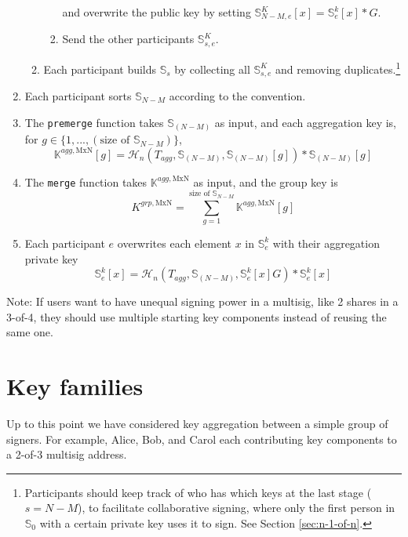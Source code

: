 \begin{enumerate}
\begin{enumerate}
\begin{enumerate}
            and overwrite the public key by setting $\mathbb{S}^K_{N-M,e}[x] = \mathbb{S}^{k}_{e}[x]*G$.
            \item Send the other participants $\mathbb{S}^K_{s,e}$.
        \end{enumerate}
        \item Each participant builds $\mathbb{S}_{s}$ by collecting all $\mathbb{S}^K_{s,e}$ and removing duplicates.\footnote{Participants should keep track of who has which keys at the last stage ($s = N-M$), to facilitate collaborative signing, where only the first person in $\mathbb{S}_0$ with a certain private key uses it to sign. See Section \ref{sec:n-1-of-n}.}
    \end{enumerate}
    \item Each participant sorts $\mathbb{S}_{N-M}$ according to the convention.
    \item The {\tt premerge} function takes $\mathbb{S}_{(N-M)}$ as input, and each aggregation key is, for \(g \in \{1,...,(\textrm{size of }\mathbb{S}_{N-M})\}\),\vspace{.175cm}
    \[\mathbb{K}^{agg,\textrm{MxN}}[g] = \mathcal{H}_n(T_{agg},\mathbb{S}_{(N-M)},\mathbb{S}_{(N-M)}[g])*\mathbb{S}_{(N-M)}[g]\]
    \item The {\tt merge} function takes $\mathbb{K}^{agg,\textrm{MxN}}$ as input, and the group key is\vspace{.175cm}
    \[K^{grp,\textrm{MxN}} = \sum^{\textrm{size of }\mathbb{S}_{N-M}}_{g = 1} \mathbb{K}^{agg,\textrm{MxN}}[g]\]
    \item Each participant $e$ overwrites each element $x$ in $\mathbb{S}^k_{e}$ with their aggregation private key\vspace{.175cm}
    \[ \mathbb{S}^k_{e}[x] = \mathcal{H}_n(T_{agg},\mathbb{S}_{(N-M)},\mathbb{S}^k_{e}[x] G)*\mathbb{S}^k_{e}[x] \]
\end{enumerate}

Note: If users want to have unequal signing power in a multisig, like 2 shares in a 3-of-4, they should use multiple starting key components instead of reusing the same one.



\section{Key families}
\label{sec:general-key-families}

Up to this point we have considered key aggregation between a simple group of signers. For example, Alice, Bob, and Carol each contributing key components to a 2-of-3 multisig address. 


